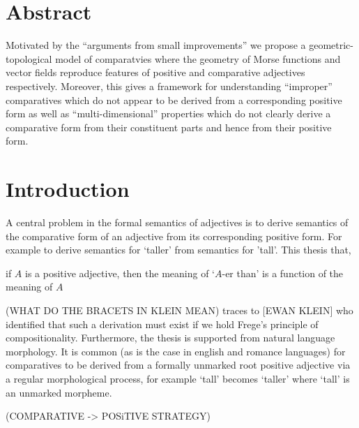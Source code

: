 \documentclass[12pt]{article}
\begin{document}
\pagestyle{fancy}
\setlength{\headheight}{11pt}
\setlength{\headsep}{0.2in}


\section{Abstract}

Motivated by the ``arguments from small improvements'' we propose a geometric-topological model of comparatvies where the geometry of Morse functions and vector fields reproduce features of positive and comparative adjectives respectively. Moreover, this gives a framework for understanding ``improper'' comparatives which do not appear to be derived from a corresponding positive form as well as ``multi-dimensional'' properties which do not clearly derive a comparative form from their constituent parts and hence from their positive form. 

\section{Introduction}

A central problem in the formal semantics of adjectives is to derive semantics of the comparative form of an adjective from its corresponding positive form. For example to derive semantics for `taller' from semantics for 'tall'. This thesis that,
\begin{center}
if $A$ is a positive adjective, then the meaning of `$A$-er than' is a function of the meaning of $A$
\end{center}
(WHAT DO THE BRACETS IN KLEIN MEAN)
traces to [EWAN KLEIN] who identified that such a derivation must exist if we hold Frege’s principle of compositionality. Furthermore, the thesis is supported from natural language morphology. It is common (as is the case in english and romance languages) for comparatives to be derived from a formally unmarked root positive adjective via a regular morphological process, for example `tall' becomes `taller' where `tall' is an unmarked morpheme. 


(COMPARATIVE -> POSiTIVE STRATEGY)
\end{document}
